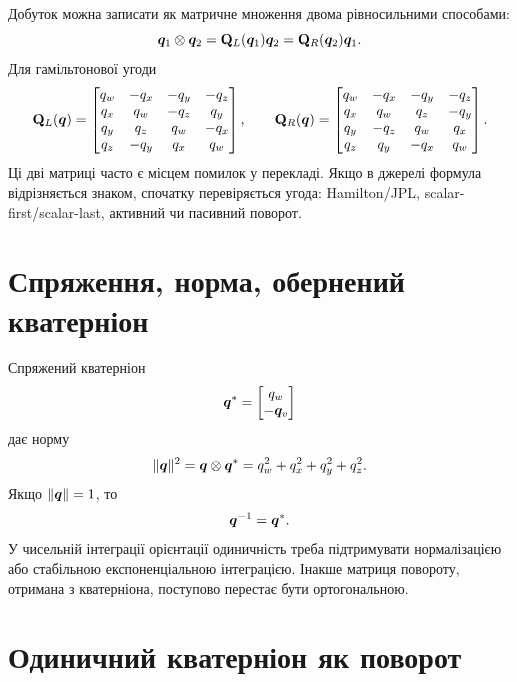 Добуток можна записати як матричне множення двома рівносильними способами:
\begin{equation}
\bm{q}_1\otimes\bm{q}_2
=\mathbf{Q}_L(\bm{q}_1)\bm{q}_2
=\mathbf{Q}_R(\bm{q}_2)\bm{q}_1.
\end{equation}
Для гамільтонової угоди
\begin{equation}\label{eq:ql_qr}
\mathbf{Q}_L(\bm{q})=
\begin{bmatrix}
q_w&-q_x&-q_y&-q_z\\
q_x&q_w&-q_z&q_y\\
q_y&q_z&q_w&-q_x\\
q_z&-q_y&q_x&q_w
\end{bmatrix},\qquad
\mathbf{Q}_R(\bm{q})=
\begin{bmatrix}
q_w&-q_x&-q_y&-q_z\\
q_x&q_w&q_z&-q_y\\
q_y&-q_z&q_w&q_x\\
q_z&q_y&-q_x&q_w
\end{bmatrix}.
\end{equation}
Ці дві матриці часто є місцем помилок у перекладі. Якщо в джерелі формула відрізняється знаком, спочатку перевіряється угода: Hamilton/JPL, scalar-first/scalar-last, активний чи пасивний поворот.

\section{Спряження, норма, обернений кватерніон}

Спряжений кватерніон
\begin{equation}
\bm{q}^* = \begin{bmatrix}q_w\\-\bm{q}_v\end{bmatrix}
\end{equation}
дає норму
\begin{equation}
\|\bm{q}\|^2=\bm{q}\otimes\bm{q}^*=q_w^2+q_x^2+q_y^2+q_z^2.
\end{equation}
Якщо $\|\bm{q}\|=1$, то
\begin{equation}
\bm{q}^{-1}=\bm{q}^*.
\end{equation}
У чисельній інтеграції орієнтації одиничність треба підтримувати нормалізацією або стабільною експоненціальною інтеграцією. Інакше матриця повороту, отримана з кватерніона, поступово перестає бути ортогональною.

\section{Одиничний кватерніон як поворот}

